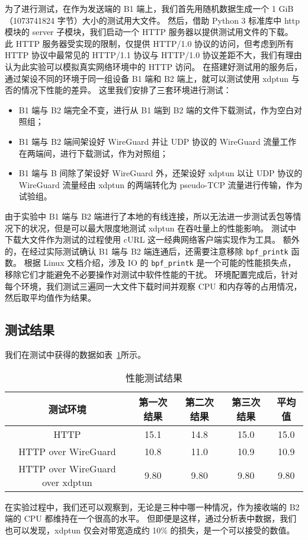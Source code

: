 为了进行测试，在作为发送端的 B1 端上，我们首先用随机数据生成一个 1 GiB（1073741824 字节）大小的测试用大文件。
然后，借助 Python 3 标准库中 http 模块的 server 子模块，我们启动一个 HTTP 服务器以提供测试用文件的下载。
此 HTTP 服务器受实现的限制，仅提供 HTTP/1.0 协议的访问，但考虑到所有 HTTP 协议中最常见的 HTTP/1.1 协议与 HTTP/1.0 协议差距不大，我们有理由认为此实验可以模拟真实网络环境中的 HTTP 访问。
在搭建好测试用的服务后，通过架设不同的环境于同一组设备 B1 端和 B2 端上，就可以测试使用 xdptun 与否的情况下性能的差异。
这里我们安排了三套环境进行测试：

\begin{itemize}
  \item B1 端与 B2 端完全不变，进行从 B1 端到 B2 端的文件下载测试，作为空白对照组；
  \item B1 端与 B2 端间架设好 WireGuard 并让 UDP 协议的 WireGuard 流量工作在两端间，进行下载测试，作为对照组；
  \item B1 端与 B 间除了架设好 WireGuard 外，还架设好 xdptun 以让 UDP 协议的 WireGuard 流量经由 xdptun 的两端转化为 pseudo-TCP 流量进行传输，作为试验组。
\end{itemize}

由于实验中 B1 端与 B2 端进行了本地的有线连接，所以无法进一步测试丢包等情况下的状况，但是可以最大限度地测试 xdptun 在吞吐量上的性能影响。
测试中下载大文件作为测试的过程使用 cURL 这一经典网络客户端实现作为工具。
额外的，在经过实际测试确认 B1 端与 B2 端连通后，还需要注意移除 \texttt{bpf\_printk} 函数。
根据 Linux 文档介绍，涉及 IO 的 \texttt{bpf\_printk} 是一个可能的性能损失点，移除它们才能避免不必要操作对测试中软件性能的干扰。
环境配置完成后，针对每个环境，我们测试三遍同一大文件下载时间并观察 CPU 和内存等的占用情况，然后取平均值作为结果。

\subsection{测试结果}

我们在测试中获得的数据如表~\ref{tab:perf-test}所示。

\begin{table}[h]
  \centering
  \caption{性能测试结果}
  \label{tab:perf-test}
  \begin{tabular}{c c c c c}
    \toprule
    测试环境 & 第一次结果 & 第二次结果 & 第三次结果 & 平均值 \\
    \midrule
    HTTP & 15.1 & 14.8 & 15.0 & 15.0 \\
    HTTP over WireGuard & 10.8 & 11.0 & 10.9 & 10.9 \\
    HTTP over WireGuard over xdptun & 9.80 & 9.80 & 9.80 & 9.80 \\
    \bottomrule
  \end{tabular}
\end{table}

在实验过程中，我们还可以观察到，无论是三种中哪一种情况，作为接收端的 B2 端的 CPU 都维持在一个很高的水平。
但即便是这样，通过分析表中数据，我们也可以发现，xdptun 仅会对带宽造成约 10\% 的损失，是一个可以接受的数值。
